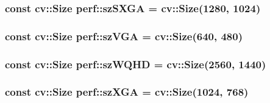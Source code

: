 \hypertarget{namespaceperf_af0980e07fe76ff27e882ecd10f34be75}{
\subsubsection[{sz\-S\-X\-G\-A}]{\setlength{\rightskip}{0pt plus 5cm}const cv\-::\-Size perf\-::sz\-S\-X\-G\-A = cv\-::\-Size(1280, 1024)}}\label{namespaceperf_af0980e07fe76ff27e882ecd10f34be75}
\hypertarget{namespaceperf_a198109adcb948fd8823f5fd653ae4813}{
\subsubsection[{sz\-V\-G\-A}]{\setlength{\rightskip}{0pt plus 5cm}const cv\-::\-Size perf\-::sz\-V\-G\-A = cv\-::\-Size(640, 480)}}\label{namespaceperf_a198109adcb948fd8823f5fd653ae4813}
\hypertarget{namespaceperf_a7d5416da78b41a2c9c541594c7168464}{
\subsubsection[{sz\-W\-Q\-H\-D}]{\setlength{\rightskip}{0pt plus 5cm}const cv\-::\-Size perf\-::sz\-W\-Q\-H\-D = cv\-::\-Size(2560, 1440)}}\label{namespaceperf_a7d5416da78b41a2c9c541594c7168464}
\hypertarget{namespaceperf_a5e19cb1374414c082b73208f4893bb90}{
\subsubsection[{sz\-X\-G\-A}]{\setlength{\rightskip}{0pt plus 5cm}const cv\-::\-Size perf\-::sz\-X\-G\-A = cv\-::\-Size(1024, 768)}}\label{namespaceperf_a5e19cb1374414c082b73208f4893bb90}
